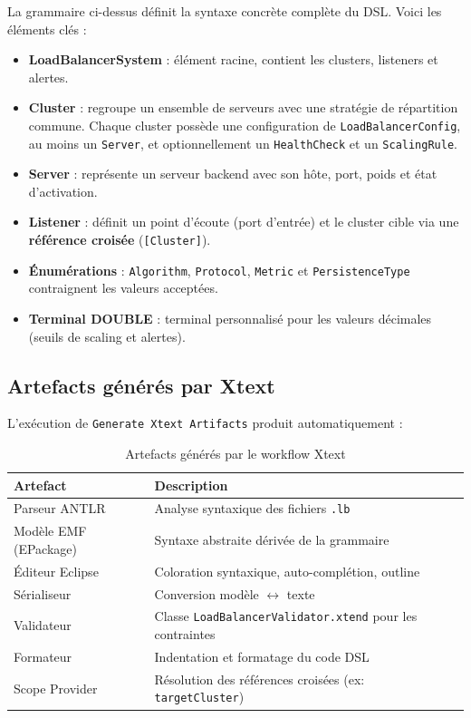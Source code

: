 \documentclass[12pt,a4paper]{report}
\begin{document}
La grammaire ci-dessus définit la syntaxe concrète complète du DSL. Voici les éléments clés :

\begin{itemize}
  \item \textbf{LoadBalancerSystem} : élément racine, contient les clusters, listeners et alertes.
  \item \textbf{Cluster} : regroupe un ensemble de serveurs avec une stratégie de répartition commune. Chaque cluster possède une configuration de \texttt{LoadBalancerConfig}, au moins un \texttt{Server}, et optionnellement un \texttt{HealthCheck} et un \texttt{ScalingRule}.
  \item \textbf{Server} : représente un serveur backend avec son hôte, port, poids et état d'activation.
  \item \textbf{Listener} : définit un point d'écoute (port d'entrée) et le cluster cible via une \textbf{référence croisée} (\texttt{[Cluster]}).
  \item \textbf{Énumérations} : \texttt{Algorithm}, \texttt{Protocol}, \texttt{Metric} et \texttt{PersistenceType} contraignent les valeurs acceptées.
  \item \textbf{Terminal DOUBLE} : terminal personnalisé pour les valeurs décimales (seuils de scaling et alertes).
\end{itemize}

\subsection{Artefacts générés par Xtext}

L'exécution de \texttt{Generate Xtext Artifacts} produit automatiquement :

\begin{table}[H]
\centering
\caption{Artefacts générés par le workflow Xtext}
\begin{tabular}{|p{5cm}|p{8cm}|}
\hline
\textbf{Artefact} & \textbf{Description} \\
\hline
Parseur ANTLR & Analyse syntaxique des fichiers \texttt{.lb} \\
\hline
Modèle EMF (EPackage) & Syntaxe abstraite dérivée de la grammaire \\
\hline
Éditeur Eclipse & Coloration syntaxique, auto-complétion, outline \\
\hline
Sérialiseur & Conversion modèle $\leftrightarrow$ texte \\
\hline
Validateur & Classe \texttt{LoadBalancerValidator.xtend} pour les contraintes \\
\hline
Formateur & Indentation et formatage du code DSL \\
\hline
Scope Provider & Résolution des références croisées (ex: \texttt{targetCluster}) \\
\hline
\end{tabular}
\end{table}
\end{document}
